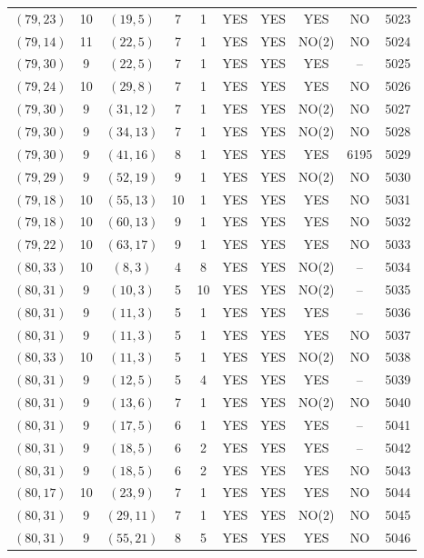 \begin{longtable}{|c|c|c|c|c|c|c|c|c|c|}
$(79, 23)$ & 10 & $(19, 5)$ & 7 & 1 & YES & YES & YES & NO & 5023\\
$(79, 14)$ & 11 & $(22, 5)$ & 7 & 1 & YES & YES & NO(2) & NO & 5024\\
$(79, 30)$ & 9 & $(22, 5)$ & 7 & 1 & YES & YES & YES & -- & 5025\\
$(79, 24)$ & 10 & $(29, 8)$ & 7 & 1 & YES & YES & YES & NO & 5026\\
$(79, 30)$ & 9 & $(31, 12)$ & 7 & 1 & YES & YES & NO(2) & NO & 5027\\
$(79, 30)$ & 9 & $(34, 13)$ & 7 & 1 & YES & YES & NO(2) & NO & 5028\\
$(79, 30)$ & 9 & $(41, 16)$ & 8 & 1 & YES & YES & YES & 6195 & 5029\\
$(79, 29)$ & 9 & $(52, 19)$ & 9 & 1 & YES & YES & NO(2) & NO & 5030\\
$(79, 18)$ & 10 & $(55, 13)$ & 10 & 1 & YES & YES & YES & NO & 5031\\
$(79, 18)$ & 10 & $(60, 13)$ & 9 & 1 & YES & YES & YES & NO & 5032\\
$(79, 22)$ & 10 & $(63, 17)$ & 9 & 1 & YES & YES & YES & NO & 5033\\
$(80, 33)$ & 10 & $(8, 3)$ & 4 & 8 & YES & YES & NO(2) & -- & 5034\\
$(80, 31)$ & 9 & $(10, 3)$ & 5 & 10 & YES & YES & NO(2) & -- & 5035\\
$(80, 31)$ & 9 & $(11, 3)$ & 5 & 1 & YES & YES & YES & -- & 5036\\
$(80, 31)$ & 9 & $(11, 3)$ & 5 & 1 & YES & YES & YES & NO & 5037\\
$(80, 33)$ & 10 & $(11, 3)$ & 5 & 1 & YES & YES & NO(2) & NO & 5038\\
$(80, 31)$ & 9 & $(12, 5)$ & 5 & 4 & YES & YES & YES & -- & 5039\\
$(80, 31)$ & 9 & $(13, 6)$ & 7 & 1 & YES & YES & NO(2) & NO & 5040\\
$(80, 31)$ & 9 & $(17, 5)$ & 6 & 1 & YES & YES & YES & -- & 5041\\
$(80, 31)$ & 9 & $(18, 5)$ & 6 & 2 & YES & YES & YES & -- & 5042\\
$(80, 31)$ & 9 & $(18, 5)$ & 6 & 2 & YES & YES & YES & NO & 5043\\
$(80, 17)$ & 10 & $(23, 9)$ & 7 & 1 & YES & YES & YES & NO & 5044\\
$(80, 31)$ & 9 & $(29, 11)$ & 7 & 1 & YES & YES & NO(2) & NO & 5045\\
$(80, 31)$ & 9 & $(55, 21)$ & 8 & 5 & YES & YES & YES & NO & 5046\\

\end{longtable}
